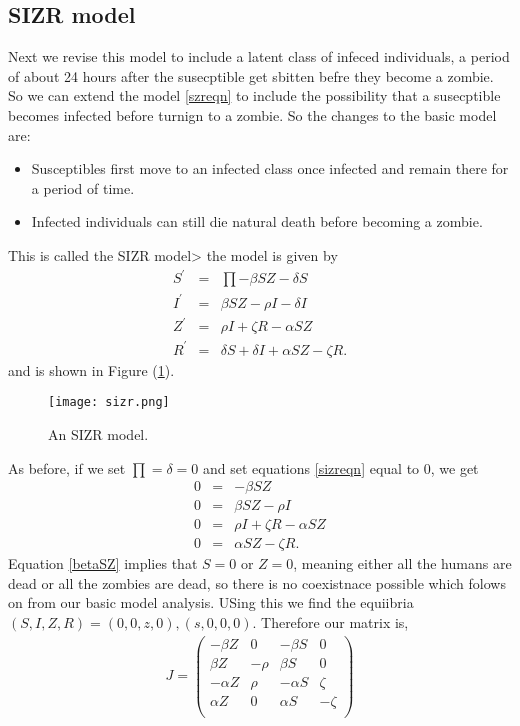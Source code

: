 \documentclass{mm2}
\numberwithin{equation}{section}
\theoremstyle{definition}
\begin{document}
\subsection{SIZR model}
Next we revise this model to include a latent class of infeced individuals, a period of about 24 hours after the susecptible get sbitten befre they become a zombie. So we can extend the model \ref{szreqn} to include the possibility that a susecptible becomes infected before turnign to a zombie. So the changes to the basic model are:
\begin{itemize}
	\item Susceptibles first move to an infected class once infected and remain there for a period of time.
	\item Infected individuals can still die natural death before becoming a zombie.
\end{itemize}
This is called the SIZR model> the model is given by
\begin{eqnarray}
S^{'} &=& \prod - \beta SZ - \delta S \nonumber \\
I^{'} &=& \beta SZ- \rho I - \delta I\nonumber \\ 
Z^{'} &=& \rho I + \zeta R - \alpha SZ \nonumber \\
R^{'} &=& \delta S + \delta I + \alpha SZ - \zeta R.
\label{sizreqn}
\end{eqnarray}
 and is shown in Figure (\ref{sizr}).\newline
\begin{figure}[ht]
	\centering
	\texttt{[image: sizr.png]}
	\caption{An SIZR model.}
	\label{sizr}
\end{figure}\newline
As before, if we set $\prod = \delta = 0$ and set equations \ref{sizreqn} equal to 0, we get
\begin{eqnarray}
0 &=& - \beta SZ \label{betaSZ}\\
0 &=& \beta SZ- \rho I \\ 
0 &=& \rho I + \zeta R - \alpha SZ \\
0 &=& \alpha SZ - \zeta R.
\label{sizreqn2}
\end{eqnarray}
Equation \ref{betaSZ} implies that $S=0$ or $Z=0$, meaning either all the humans are dead or all the zombies are dead, so there is no coexistnace possible which folows on from our basic model analysis. USing this we find the equiibria $(S, I, Z, R) = (0, 0, z, 0), (s, 0, 0, 0)$. Therefore our matrix is,
\begin{eqnarray}
J = 
\begin{pmatrix}
-\beta Z & 0 & -\beta S & 0 \\
\beta Z & -\rho & \beta S & 0 \\
-\alpha Z & \rho & -\alpha S & \zeta \\
\alpha Z & 0 & \alpha S & -\zeta \\
\end{pmatrix}
\end{eqnarray}
\end{document}
